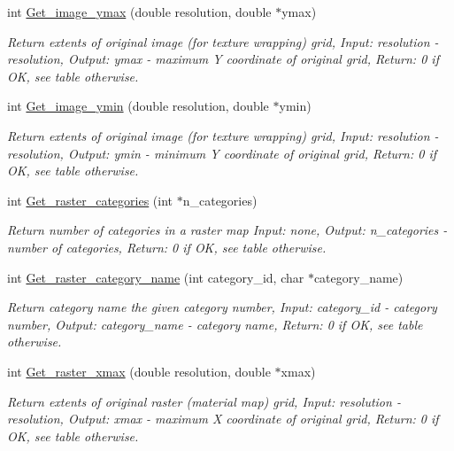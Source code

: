 \begin{CompactItemize}
int \hyperlink{GisApi_8C_a41}{Get\_\-image\_\-ymax} (double resolution, double $\ast$ymax)
\begin{CompactList}\small\item\em Return extents of original image (for texture wrapping) grid, Input: resolution - resolution, Output: ymax - maximum Y coordinate of original grid, Return: 0 if OK, see table otherwise. \item\end{CompactList}\item 
int \hyperlink{GisApi_8C_a42}{Get\_\-image\_\-ymin} (double resolution, double $\ast$ymin)
\begin{CompactList}\small\item\em Return extents of original image (for texture wrapping) grid, Input: resolution - resolution, Output: ymin - minimum Y coordinate of original grid, Return: 0 if OK, see table otherwise. \item\end{CompactList}\item 
int \hyperlink{GisApi_8C_a43}{Get\_\-raster\_\-categories} (int $\ast$n\_\-categories)
\begin{CompactList}\small\item\em Return number of categories in a raster map Input: none, Output: n\_\-categories - number of categories, Return: 0 if OK, see table otherwise. \item\end{CompactList}\item 
int \hyperlink{GisApi_8C_a44}{Get\_\-raster\_\-category\_\-name} (int category\_\-id, char $\ast$category\_\-name)
\begin{CompactList}\small\item\em Return category name the given category number, Input: category\_\-id - category number, Output: category\_\-name - category name, Return: 0 if OK, see table otherwise. \item\end{CompactList}\item 
int \hyperlink{GisApi_8C_a45}{Get\_\-raster\_\-xmax} (double resolution, double $\ast$xmax)
\begin{CompactList}\small\item\em Return extents of original raster (material map) grid, Input: resolution - resolution, Output: xmax - maximum X coordinate of original grid, Return: 0 if OK, see table otherwise. \item\end{CompactList}\item 

\end{CompactItemize}

